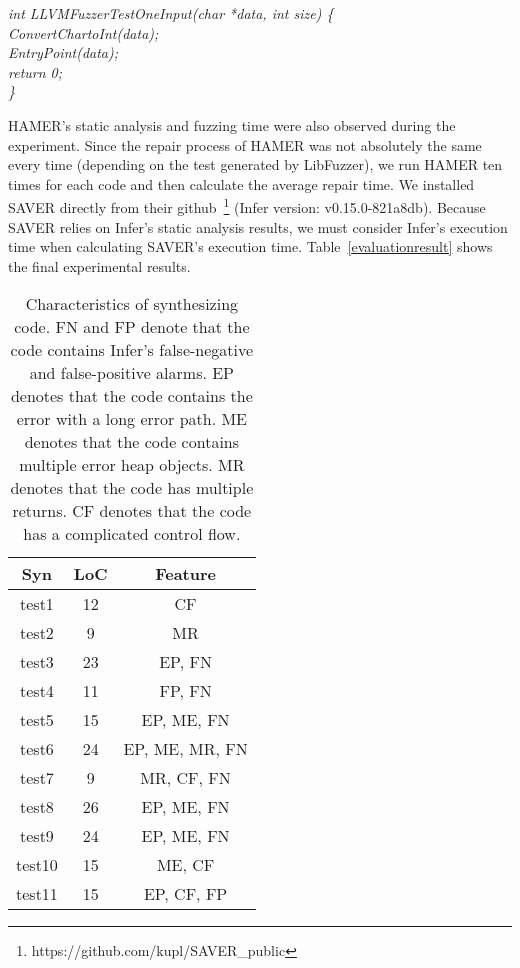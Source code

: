 \documentclass[a4paper,11pt,oneside,openany]{book}
\begin{document}
\begin{minipage}{\textwidth}
    \vspace{0.2cm}
    \textsl{\hspace{0.3cm}int LLVMFuzzerTestOneInput(char *data, int size) \{\\\hspace{0.6cm}ConvertChartoInt(data);\\\hspace{0.6cm}EntryPoint(data);\\\hspace{0.6cm}return 0;\\\hspace{0.3cm}\}}
    \vspace{0.2cm}
\end{minipage}
HAMER's static analysis and fuzzing time were also observed during the experiment. Since the repair process of HAMER was not absolutely the same every time (depending on the test generated by LibFuzzer), we run HAMER ten times for each code and then calculate the average repair time. We installed SAVER directly from their github~\footnote{https://github.com/kupl/SAVER\_public} (Infer version: v0.15.0-821a8db). Because SAVER relies on Infer's static analysis results, we must consider Infer's execution time when calculating SAVER's execution time. Table~\ref{evaluationresult} shows the final experimental results.



\begin{table}[t]
  \caption[Characteristics of synthesizing code]{Characteristics of synthesizing code. FN and FP denote that the code contains Infer's false-negative and false-positive alarms. EP denotes that the code contains the error with a long error path. ME denotes that the code contains multiple error heap objects. MR denotes that the code has multiple returns. CF denotes that the code has a complicated control flow.}
  \label{syncode}
  \centering
  \begin{tabular}{ccc}
   Syn & LoC  &  Feature \\
    \hline
    test1     & 12  &  CF \\
    test2     & 9   &  MR \\
    test3     & 23  &  EP, FN \\
    test4      & 11 &  FP, FN \\
    test5      & 15 &  EP, ME, FN \\
    test6      & 24 &  EP, ME, MR, FN \\
    test7      & 9   &  MR, CF, FN \\
    test8      & 26 &  EP, ME, FN \\
    test9     & 24  &  EP, ME, FN \\
    test10   & 15  &  ME, CF \\
    test11   & 15  &  EP, CF, FP \\
    \hline
  \end{tabular}
\end{table}
\end{document}
